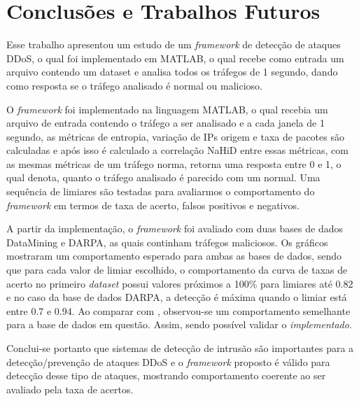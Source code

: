 \chapter[Conclusões e Trabalhos Futuros]{Conclusões e Trabalhos Futuros}
Esse trabalho apresentou um estudo de um \textit{framework} de detecção de ataques DDoS, o qual foi implementado em MATLAB, o qual recebe como entrada um arquivo contendo um dataset e analisa todos os tráfegos de 1 segundo, dando como resposta se o tráfego analisado é normal ou malicioso. 

O \textit{framework} foi implementado na linguagem MATLAB, o qual recebia um arquivo de entrada contendo o tráfego a ser analisado e a cada janela de 1 segundo, as métricas de entropia, variação de IPs origem e taxa de pacotes são calculadas e após isso é calculado a correlação NaHiD entre essas métricas, com as mesmas métricas de um tráfego norma, retorna uma resposta entre 0 e 1, o qual denota, quanto o tráfego analisado é parecido com um normal. Uma sequência de limiares são testadas para avaliarmos o comportamento do \textit{framework} em termos de taxa de acerto, falsos positivos e negativos.

A partir da implementação, o \textit{framework} foi avaliado com duas bases de dados DataMining e DARPA, as quais continham tráfegos maliciosos. Os gráficos mostraram um comportamento esperado para ambas as bases de dados, sendo que para cada valor de limiar escolhido, o comportamento da curva de taxas de acerto no primeiro \textit{dataset} possui valores próximos a 100\% para limiares até 0.82 e no caso da base de dados DARPA, a detecção é máxima quando o limiar está entre 0.7 e 0.94. Ao comparar com \cite{HOQUE201748}, observou-se um comportamento semelhante para a base de dados em questão. Assim, sendo possível validar o \textit{implementado}.

Conclui-se portanto que sistemas de detecção de intrusão são importantes para a detecção/prevenção de ataques DDoS e o \textit{framework} proposto é válido para detecção desse tipo de ataques, mostrando comportamento coerente ao ser avaliado pela taxa de acertos. 

